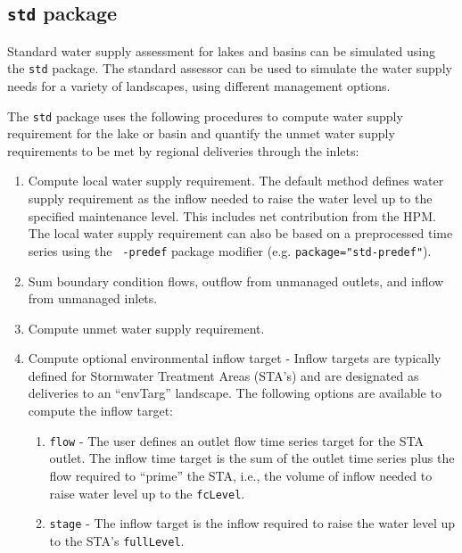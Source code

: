 \subsection{{\tt std} package}

Standard water supply assessment for lakes and basins can be
simulated using the {\tt std} package.  The standard assessor can be
used to simulate the water supply needs for a variety of landscapes,
using different management options.  

The {\tt std} package uses the following procedures to compute water
supply requirement for the lake or basin and quantify the unmet water
supply requirements to be met by regional deliveries through the
inlets:

\begin{enumerate}
 \item Compute local water supply requirement.  The default method
   defines water supply requirement as the inflow needed to raise the
   water level up to the specified maintenance level.  This includes
   net contribution from the HPM.  The local water supply requirement
   can also be based on a preprocessed time series using the {\tt
   -predef} package modifier (e.g. {\tt package="std-predef"}).

 \item Sum boundary condition flows, outflow from unmanaged outlets,
   and inflow from unmanaged inlets.

 \item Compute unmet water supply requirement.

 \item Compute optional environmental inflow target \-- Inflow targets
   are typically defined for Stormwater Treatment Areas (STA's) and
   are designated as deliveries to an ``envTarg'' landscape.  The
   following options are available to compute the inflow target:

   \begin{enumerate}

    \item {\tt flow} - The user defines an outlet flow time series
      target for the STA outlet.  The inflow time target is the sum of
      the outlet time series plus the flow required to ``prime'' the
      STA, i.e., the volume of inflow needed to raise water level up
      to the {\tt fcLevel}.

    \item {\tt stage} - The inflow target is the inflow required to
      raise the water level up to the STA's {\tt fullLevel}.
   \end{enumerate}


\end{enumerate}
